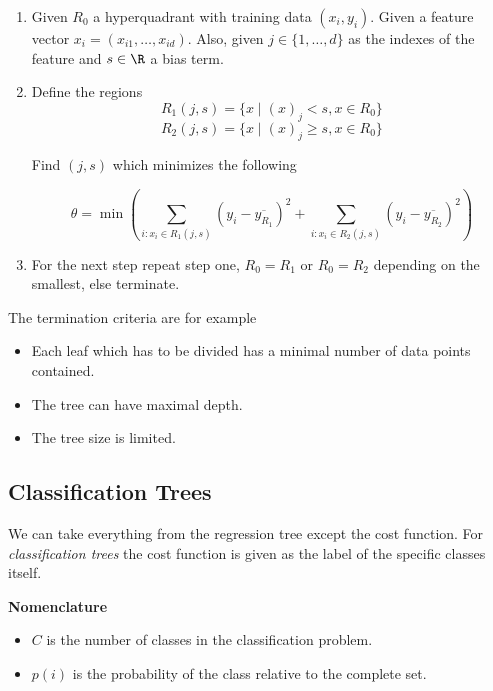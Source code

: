 \begin{enumerate}

    \item Given \(R_0\) a hyperquadrant with training data \((x_i, y_i)\). Given a feature vector \(x_i = (x_{i1}, \dots, x_{id})\). Also, given 
     \(j \in \{1, \dots, d\}\) as the indexes of the feature and \(s \in \R\) a bias term. 

    \item Define the regions 
    \[
        R_1(j,s) = \{x \mid (x)_j < s, x \in R_0\}
    \]
    \[
        R_2(j,s) = \{x \mid (x)_j \ge s, x \in R_0\}
    \]

    Find \((j, s)\) which minimizes the following 

    \[
        \theta = \min \left(\sum_{i:x_i \in R_1 (j,s)} (y_i - \overline{y_{R_1}})^2 + \sum_{i:x_i \in R_2 (j,s)} (y_i - \overline{y_{R_2}})^2\right) 
    \]

    \item For the next step repeat step one, \(R_0 = R_1\) or \(R_0 = R_2\) depending on the smallest, else terminate.
\end{enumerate}

The termination criteria are for example 

\begin{itemize}
    \item Each leaf which has to be divided has a minimal number of data points contained.

    \item The tree can have maximal depth. 
    
    \item The tree size is limited.
\end{itemize}

\subsection{Classification Trees}

We can take everything from the regression tree except the cost function. For 
\emph{classification trees} the cost function is given as the label of the specific classes itself.

\textbf{Nomenclature}

\begin{itemize}
    \item \(C\) is the number of classes in the classification problem. 

    \item \(p(i)\) is the probability of the class relative to the complete set.
\end{itemize}

